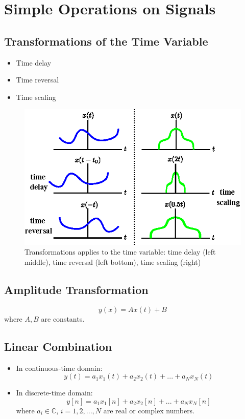 \section{Simple Operations on Signals}
 \subsection{Transformations of the Time Variable}
 \begin{itemize}
 \item Time delay
 \item Time reversal 
 \item Time scaling
 \end{itemize}
\begin{figure}[H]
    \centering 
    \includegraphics[width=.7\textwidth]{images/transformation.eps}
    \caption{Transformations applies to the time variable: time delay (left middle), time reversal (left bottom), time scaling (right)} 
\end{figure}
  \subsection{Amplitude Transformation}
  \[ y(x) = Ax(t)+B \]
  \quad where $A,B$ are constants.
\subsection{Linear Combination}
\begin{itemize}
\item In continuous-time domain:
\[ y(t) = a_{1}x_{1}(t)+a_{2}x_{2}(t)+...+a_{N}x_{N}(t) \]
\item In discrete-time domain:
\[ y[n] = a_{1}x_{1}[n]+a_{2}x_{2}[n]+...+a_{N}x_{N}[n] \]
 \quad where $a_{i} \in \mathbb{C}$, $i=1,2,...,N$ are real or complex numbers.
\end{itemize}
